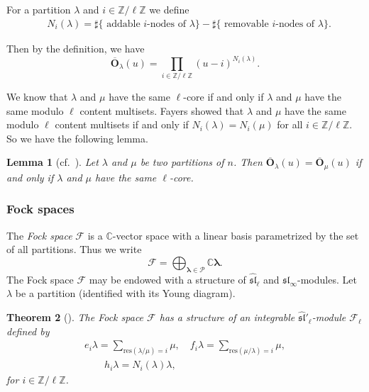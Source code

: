 \documentclass[12pt]{amsart}
\numberwithin{itemcounter}{subsection}
\theoremstyle{plain}
\newtheorem{theorem}{Theorem}[section]
\newtheorem{lemma}[theorem]{Lemma}
\theoremstyle{definition}
\theoremstyle{remark}
\numberwithin{equation}{section}
\def\bbC{\mathbb{C}}
\def\bbZ{\mathbb{Z}}
\def\calP{\mathcal{P}}
\def\bfO{\mathbf{O}}
\begin{document}
									For a partition $\lambda$ and $i\in\bbZ/\ell\bbZ$ we define
									\begin{align*}
										&N_i(\lambda ) = \sharp\{ \text{ addable $i$-nodes of $\lambda$}\}
										- \sharp\{ \text{ removable $i$-nodes of $\lambda$} \}.
									\end{align*}

									Then by the definition, we have
									$$\overline{\bfO}_{\lambda}(u)=\prod_{i\in \bbZ/\ell\bbZ}(u-i)^{{N_i}(\lambda)}.$$

									We know that $\lambda$ and $\mu$ have the same $\ell$-core if and only if $\lambda$ and $\mu$ have the same modulo $\ell$ content multisets.
									Fayers \cite{F06} showed that $\lambda$ and $\mu$ have the same modulo $\ell$ content multisets if and only if  $N_i(\lambda)=N_{i}(\mu)$ for all $i\in \bbZ/\ell\bbZ.$ So we have the following lemma.

									\begin{lemma}[cf.~\cite{F06}]
										Let $\lambda$ and $\mu$ be two partitions of $n$.
										Then $\overline{\bfO}_{\lambda}(u)=\overline{\bfO}_{\mu}(u)$ if and only if $\lambda$ and $\mu$ have the same $\ell$-core.
									\end{lemma}

									\subsubsection{Fock spaces}

									The \emph{Fock space} $\mathcal{F}$
									is a $\bbC$-vector space with a linear basis parametrized by the set of all partitions. Thus we write
									\[
									\mathcal{F}=\bigoplus_{{\boldsymbol{\lambda}}\in\calP
									}\bbC{\boldsymbol{\lambda}}.
									\]
									The Fock space $\mathcal{F}$ may be endowed with a structure of
									$\widehat{\mathfrak{sl}}_{\ell}$ and $\mathfrak{sl}_{\infty}$-modules. Let $\lambda$ be a partition (identified with its Young diagram).

									\begin{theorem}[\cite{Ug99}]\label{thm:Fock}
										The Fock space
										$\mathcal{F}$ has a structure of an integrable
										$\widehat{\mathfrak{sl}}'_{\ell}$-module $\mathcal{F}_{\ell}$ defined
										by
										\begin{gather*}
											e_{i}{\lambda}=\sum_{\text{res}(\lambda/\mu)=i}{\mu},\quad{f_{i}{\lambda}=\sum_{\text{res}(\mu/\lambda
													)=i}\mu},\\[5pt]
											\qquad h_{i}{\lambda}={N_{i}(\lambda)}
											{\lambda},
										\end{gather*}
										for $i\in\mathbb{Z}/\ell\mathbb{Z}$.
									\end{theorem}
\end{document}
